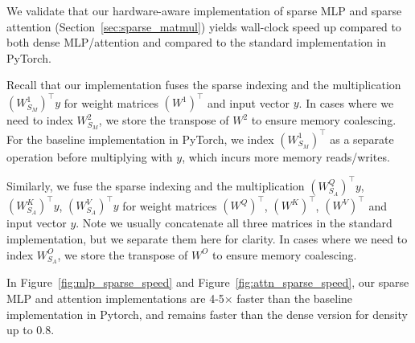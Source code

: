 We validate that our hardware-aware implementation of sparse MLP and sparse
attention (Section~\ref{sec:sparse_matmul}) yields wall-clock speed up compared to both dense MLP/attention and
compared to the standard implementation in PyTorch.

Recall that our implementation fuses the sparse indexing and the multiplication
$(W_{S_M}^1)^\top y$ for weight matrices $(W^1)^\top$ and input vector $y$.
In cases where we need to index $W^2_{S_M}$, we store the transpose of
$W^2$ to ensure memory coalescing.
For the baseline implementation in PyTorch, we index
$(W_{S_M}^1)^\top$ as a separate operation before multiplying with $y$, which
incurs more memory reads/writes. 

Similarly, we fuse the sparse indexing and the multiplication
$(W_{S_A}^Q)^\top y$, $(W_{S_A}^K)^\top y$, $(W_{S_A}^V)^\top y$ for weight matrices $(W^Q)^\top$, $(W^K)^\top$, $(W^V)^\top$ and input vector $y$. Note we usually concatenate all three matrices in the standard implementation, but we separate them here for clarity. In cases where we need to index $W^O_{S_A}$, we store the transpose of
$W^O$ to ensure memory coalescing.

In Figure~\ref{fig:mlp_sparse_speed} and Figure~\ref{fig:attn_sparse_speed}, our
sparse MLP and attention implementations are 4-5$\times$ faster than the baseline
implementation in Pytorch, and remains faster than the dense version for density
up to 0.8.
